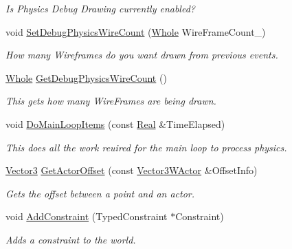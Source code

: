 \begin{DoxyCompactItemize}
\begin{DoxyCompactList}\small\item\em Is Physics Debug Drawing currently enabled? \item\end{DoxyCompactList}\item 
void \hyperlink{classphys_1_1PhysicsManager_ab43a963cf26ca4293a7c34a2a68c4f2c}{SetDebugPhysicsWireCount} (\hyperlink{namespacephys_a460f6bc24c8dd347b05e0366ae34f34a}{Whole} WireFrameCount\_\-)
\begin{DoxyCompactList}\small\item\em How many Wireframes do you want drawn from previous events. \item\end{DoxyCompactList}\item 
\hyperlink{namespacephys_a460f6bc24c8dd347b05e0366ae34f34a}{Whole} \hyperlink{classphys_1_1PhysicsManager_a8f46e55e4cadfcd1c2c03bcdbfe6c06f}{GetDebugPhysicsWireCount} ()
\begin{DoxyCompactList}\small\item\em This gets how many WireFrames are being drawn. \item\end{DoxyCompactList}\item 
void \hyperlink{classphys_1_1PhysicsManager_ad363d6683a0276395eeb2c42a56f95fc}{DoMainLoopItems} (const \hyperlink{namespacephys_af7eb897198d265b8e868f45240230d5f}{Real} \&TimeElapsed)
\begin{DoxyCompactList}\small\item\em This does all the work reuired for the main loop to process physics. \item\end{DoxyCompactList}\item 
\hyperlink{classphys_1_1Vector3}{Vector3} \hyperlink{classphys_1_1PhysicsManager_a54a48fdfd9db914c25a0f892c2f56301}{GetActorOffset} (const \hyperlink{classphys_1_1Vector3WActor}{Vector3WActor} \&OffsetInfo)
\begin{DoxyCompactList}\small\item\em Gets the offset between a point and an actor. \item\end{DoxyCompactList}\item 
void \hyperlink{classphys_1_1PhysicsManager_ab31bf38e9ed68c484946731546425691}{AddConstraint} (TypedConstraint $\ast$Constraint)
\begin{DoxyCompactList}\small\item\em Adds a constraint to the world. \item\end{DoxyCompactList}\item 

\end{DoxyCompactItemize}
